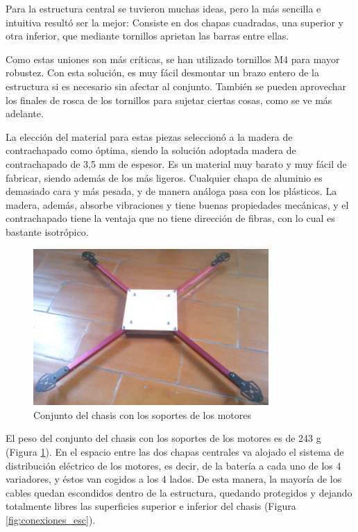 \documentclass[12pt,twoside]{article}
\begin{document}
Para la estructura central se tuvieron muchas ideas, pero la más sencilla e intuitiva resultó ser la mejor: Consiste en dos chapas cuadradas, una superior y otra inferior, que mediante tornillos aprietan las barras entre ellas. 

Como estas uniones son más críticas, se han utilizado tornillos M4 para mayor robustez. Con esta solución, es muy fácil desmontar un brazo entero de la estructura si es necesario sin afectar al conjunto. También se pueden aprovechar los finales de rosca de los tornillos para sujetar ciertas cosas, como se ve más adelante.

La elección del material para estas piezas seleccionó a la madera de contrachapado como óptima, siendo la solución adoptada madera de contrachapado de 3,5 mm de espesor. Es un material muy barato y muy fácil de fabricar, siendo además de los más ligeros. Cualquier chapa de aluminio es demasiado cara y más pesada, y de manera análoga pasa con los plásticos. La madera, además, absorbe vibraciones y tiene buenas propiedades mecánicas, y el contrachapado tiene la ventaja que no tiene dirección de fibras, con lo cual es bastante isotrópico.

		\begin{figure}
			\centering
			\includegraphics[width=0.8\textwidth]{Imatges/Disseny_Chasis/quad_frame.png}
			\caption{Conjunto del chasis con los soportes de los motores}
			\label{fig:quad_frame}
		\end{figure}

El peso del conjunto del chasis con los soportes de los motores es de 243 g (Figura \ref{fig:quad_frame}).
En el espacio entre las dos chapas centrales va alojado el sistema de distribución eléctrico de los motores, es decir, de la batería a cada uno de los 4 variadores, y éstos van cogidos a los 4 lados. De esta manera, la mayoría de los cables quedan escondidos dentro de la estructura, quedando protegidos y dejando totalmente libres las superficies superior e inferior del chasis (Figura \ref{fig:conexiones_esc}).
\end{document}

